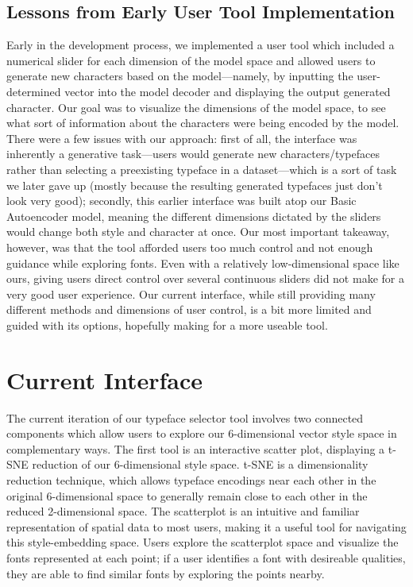 \subsection{Lessons from Early User Tool Implementation}

Early in the development process, we implemented a user tool which included a numerical slider for each dimension of the model space and allowed users to generate new characters based on the model---namely, by inputting the user-determined vector into the model decoder and displaying the output generated character. Our goal was to visualize the dimensions of the model space, to see what sort of information about the characters were being encoded by the model. There were a few issues with our approach: first of all, the interface was inherently a generative task---users would generate new characters/typefaces rather than selecting a preexisting typeface in a dataset---which is a sort of task we later gave up (mostly because the resulting generated typefaces just don't look very good); secondly, this earlier interface was built atop our Basic Autoencoder model, meaning the different dimensions dictated by the sliders would change both style and character at once. Our most important takeaway, however, was that the tool afforded users too much control and not enough guidance while exploring fonts. Even with a relatively low-dimensional space like ours, giving users direct control over several continuous sliders did not make for a very good user experience. Our current interface, while still providing many different methods and dimensions of user control, is a bit more limited and guided with its options, hopefully making for a more useable tool.

\section{Current Interface}

The current iteration of our typeface selector tool involves two connected components which allow users to explore our 6-dimensional vector style space in complementary ways. The first tool is an interactive scatter plot, displaying a t-SNE reduction of our 6-dimensional style space. t-SNE \cite{vandermaaten2008} is a dimensionality reduction technique, which allows typeface encodings near each other in the original 6-dimensional space to generally remain close to each other in the reduced 2-dimensional space. The scatterplot is an intuitive and familiar representation of spatial data to most users, making it a useful tool for navigating this style-embedding space. Users explore the scatterplot space and visualize the fonts represented at each point; if a user identifies a font with desireable qualities, they are able to find similar fonts by exploring the points nearby.

